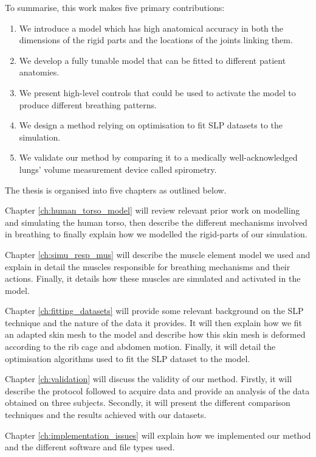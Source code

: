 To summarise, this work makes five primary contributions:
\begin{enumerate}
	\item We introduce a model which has high anatomical accuracy in both the dimensions of the rigid parts and the locations of the joints linking them.
	\item We develop a fully tunable model that can be fitted to different patient anatomies.
	\item We present high-level controls that could be used to activate the model to produce different breathing patterns.
	\item We design a method relying on optimisation to fit SLP datasets to the simulation.
	\item We validate our method by comparing it to a medically well-acknowledged lungs' volume measurement device called spirometry.
\end{enumerate}


The thesis is organised into five chapters as outlined below.

Chapter \ref{ch:human_torso_model} will review relevant prior work on modelling and simulating the human torso, then describe the different mechanisms involved in breathing to finally explain how we modelled the rigid-parts of our simulation. 

Chapter \ref{ch:simu_resp_mus} will describe the muscle element model we used and explain in detail the muscles responsible for breathing mechanisms and their actions. Finally, it details how these muscles are simulated and activated in the model.

Chapter \ref{ch:fitting_datasets} will provide some relevant background on the SLP technique and the nature of the data it provides. It will then explain how we fit an adapted skin mesh to the model and describe how this skin mesh is deformed according to the rib cage and abdomen motion. Finally, it will detail the optimisation algorithms used to fit the SLP dataset to the model.

Chapter \ref{ch:validation} will discuss the validity of our method. Firstly, it will describe the protocol followed to acquire data and provide an analysis of the data obtained on three subjects. Secondly, it will present the different comparison techniques and the results achieved with our datasets.

Chapter \ref{ch:implementation_issues} will explain how we implemented our method and the different software and file types used.